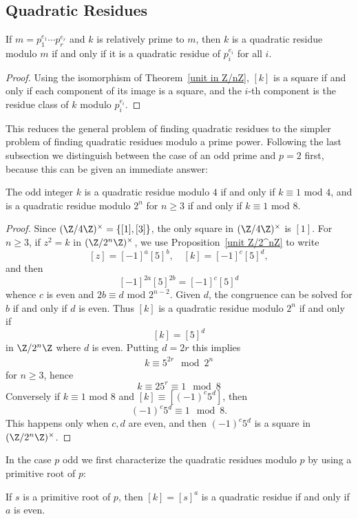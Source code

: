 \subsection{Quadratic Residues}
\begin{proposition}
If $m=p_1^{e_1}\cdots p_r^{e_r}$ and $k$ is relatively prime to $m$, then $k$ is a quadratic residue modulo $m$ if and only if it is a quadratic residue of $p^{e_i}_i$ for all $i$.
\end{proposition}
\begin{proof}
Using the isomorphism of Theorem~\ref{unit in Z/nZ}, $[k]$ is a square if and only if each component of its image is a square, and the $i$-th component is the residue class of $k$ modulo $p_i^{e_i}$.
\end{proof}
This reduces the general problem of finding quadratic residues to the simpler problem of finding quadratic residues modulo a prime power. Following the last subsection we distinguish between the case of an odd prime and $p=2$ first, because this can be given an immediate answer:
\begin{proposition}
The odd integer $k$ is a quadratic residue modulo $4$ if and only if $k\equiv1$ mod $4$, and is a quadratic residue modulo $2^n$ for $n\geq3$ if and only if $k\equiv1$ mod $8$.
\end{proposition}
\begin{proof}
Since $(\Z/4\Z)^\times=\{[1],[3]\}$, the only square in $(\Z/4\Z)^\times$ is $[1]$. For $n\geq 3$, if $z^2=k$ in $(\Z/2^n\Z)^\times$, we use Proposition~\ref{unit Z/2^nZ} to write
\[[z]=[-1]^a[5]^b,\quad [k]=[-1]^c[5]^d,\]
and then
\[[-1]^{2a}[5]^{2b}=[-1]^c[5]^d\]
whence $c$ is even and $2b\equiv d$ mod $2^{n-2}$. Given $d$, the congruence can be solved for $b$ if and only if $d$ is even. Thus $[k]$ is a quadratic residue modulo $2^n$ if and only if
\[[k]=[5]^d\]
in $\Z/2^n\Z$ where $d$ is even. Putting $d=2r$ this implies
\begin{align*}
k\equiv 5^{2r}\mod 2^n
\end{align*}
for $n\geq 3$, hence 
\[k\equiv 25^r\equiv 1\mod 8\]
Conversely if $k\equiv1$ mod $8$ and $[k]\equiv[(-1)^c5^d]$, then \[(-1)^c5^d\equiv 1\mod 8.\]
This happens only when $c,d$ are even, and then $(-1)^c5^d$ is a square in $(\Z/2^n\Z)^\times$.
\end{proof}
In the case $p$ odd we first characterize the quadratic residues modulo $p$ by using a primitive root of $p$:
\begin{lemma}\label{primitive root squre}
If $s$ is a primitive root of $p$, then $[k]=[s]^a$ is a quadratic residue if and only if $a$ is even.
\end{lemma}
